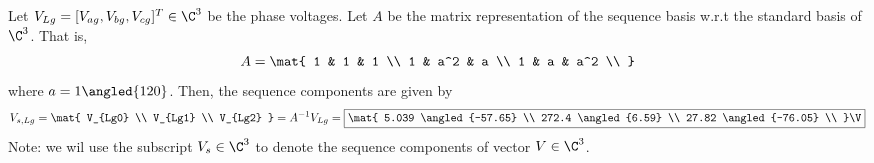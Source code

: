 \documentclass{homework}
\begin{document}
\begin{letterenum}
    \item Let $V_{Lg} = [V_{ag}, V_{bg}, V_{cg}]^T \in \C^3$ be the 
    phase voltages. Let $A$ be the matrix representation of the sequence basis
    w.r.t the standard basis of $\C^3$. That is,
    \begin{equation}
        A = \mat{
            1 & 1 & 1 \\
            1 & a^2 & a \\
            1 & a & a^2 \\
        }
    \end{equation}
    where $a = 1 \angled{120}$. Then, the sequence components are given by
    \begin{equation*}
        V_{s,Lg} = \mat{
            V_{Lg0} \\ V_{Lg1} \\ V_{Lg2}
        } = A^{-1} V_{Lg} = \boxed{\mat{
            5.039 \angled{-57.65} \\
            272.4 \angled{6.59} \\
            27.82 \angled{-76.05} \\
        } \V}
    \end{equation*}
    Note: we wil use the subscript $V_s \in \C^3$ to denote the sequence components
    of vector $V \in \C^3$.


\end{letterenum}
\end{document}
